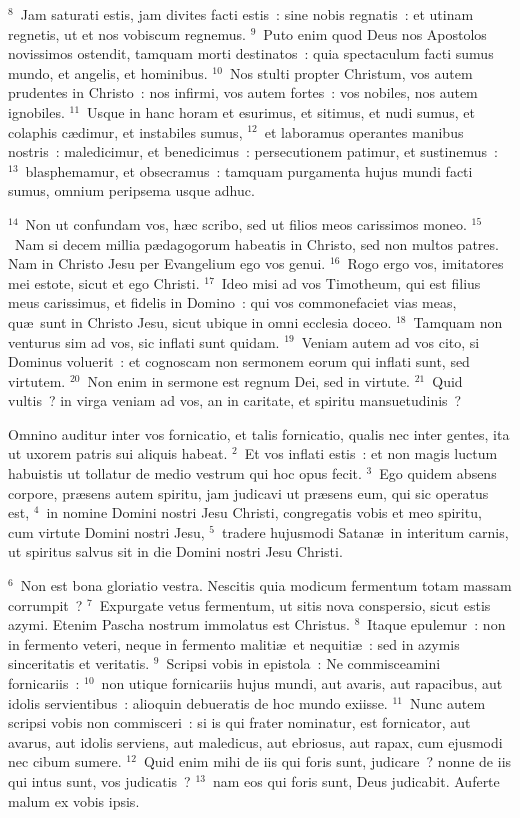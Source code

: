 ${}^{8}$~Jam saturati estis, jam divites facti estis~: sine nobis regnatis~: et utinam regnetis, ut et nos vobiscum regnemus.
${}^{9}$~Puto enim quod Deus nos Apostolos novissimos ostendit, tamquam morti destinatos~: quia spectaculum facti sumus mundo, et angelis, et hominibus.
${}^{10}$~Nos stulti propter Christum, vos autem prudentes in Christo~: nos infirmi, vos autem fortes~: vos nobiles, nos autem ignobiles.
${}^{11}$~Usque in hanc horam et esurimus, et sitimus, et nudi sumus, et colaphis c\ae dimur, et instabiles sumus,
${}^{12}$~et laboramus operantes manibus nostris~: maledicimur, et benedicimus~: persecutionem patimur, et sustinemus~:
${}^{13}$~blasphemamur, et obsecramus~: tamquam purgamenta hujus mundi facti sumus, omnium peripsema usque adhuc.


${}^{14}$~Non ut confundam vos, h\ae c scribo, sed ut filios meos carissimos moneo.
${}^{15}$~Nam si decem millia p\ae dagogorum habeatis in Christo, sed non multos patres. Nam in Christo Jesu per Evangelium ego vos genui.
${}^{16}$~Rogo ergo vos, imitatores mei estote, sicut et ego Christi.
${}^{17}$~Ideo misi ad vos Timotheum, qui est filius meus carissimus, et fidelis in Domino~: qui vos commonefaciet vias meas, qu\ae\ sunt in Christo Jesu, sicut ubique in omni ecclesia doceo.
${}^{18}$~Tamquam non venturus sim ad vos, sic inflati sunt quidam.
${}^{19}$~Veniam autem ad vos cito, si Dominus voluerit~: et cognoscam non sermonem eorum qui inflati sunt, sed virtutem.
${}^{20}$~Non enim in sermone est regnum Dei, sed in virtute.
${}^{21}$~Quid vultis~? in virga veniam ad vos, an in caritate, et spiritu mansuetudinis~?

\lettrine[lines=3,image=true,loversize=0.05,lraise=-0.03]{O}{}mnino auditur inter vos fornicatio, et talis fornicatio, qualis nec inter gentes, ita ut uxorem patris sui aliquis habeat.
${}^{2}$~Et vos inflati estis~: et non magis luctum habuistis ut tollatur de medio vestrum qui hoc opus fecit.
${}^{3}$~Ego quidem absens corpore, pr\ae sens autem spiritu, jam judicavi ut pr\ae sens eum, qui sic operatus est,
${}^{4}$~in nomine Domini nostri Jesu Christi, congregatis vobis et meo spiritu, cum virtute Domini nostri Jesu,
${}^{5}$~tradere hujusmodi Satan\ae\ in interitum carnis, ut spiritus salvus sit in die Domini nostri Jesu Christi.


${}^{6}$~Non est bona gloriatio vestra. Nescitis quia modicum fermentum totam massam corrumpit~?
${}^{7}$~Expurgate vetus fermentum, ut sitis nova conspersio, sicut estis azymi. Etenim Pascha nostrum immolatus est Christus.
${}^{8}$~Itaque epulemur~: non in fermento veteri, neque in fermento maliti\ae\ et nequiti\ae~: sed in azymis sinceritatis et veritatis.
${}^{9}$~Scripsi vobis in epistola~: Ne commisceamini fornicariis~:
${}^{10}$~non utique fornicariis hujus mundi, aut avaris, aut rapacibus, aut idolis servientibus~: alioquin debueratis de hoc mundo exiisse.
${}^{11}$~Nunc autem scripsi vobis non commisceri~: si is qui frater nominatur, est fornicator, aut avarus, aut idolis serviens, aut maledicus, aut ebriosus, aut rapax, cum ejusmodi nec cibum sumere.
${}^{12}$~Quid enim mihi de iis qui foris sunt, judicare~? nonne de iis qui intus sunt, vos judicatis~?
${}^{13}$~nam eos qui foris sunt, Deus judicabit. Auferte malum ex vobis ipsis.

